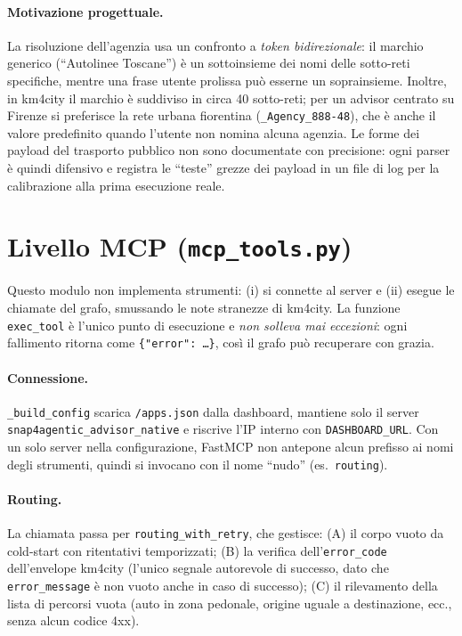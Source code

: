 \documentclass[11pt,a4paper]{article}
\begin{document}
\paragraph{Motivazione progettuale.} La risoluzione dell'agenzia usa un
confronto a \emph{token bidirezionale}: il marchio generico (``Autolinee
Toscane'') è un sottoinsieme dei nomi delle sotto-reti specifiche, mentre una
frase utente prolissa può esserne un soprainsieme. Inoltre, in km4city il
marchio è suddiviso in circa 40 sotto-reti; per un advisor centrato su Firenze
si preferisce la rete urbana fiorentina (\texttt{\_Agency\_888-48}), che è anche
il valore predefinito quando l'utente non nomina alcuna agenzia. Le forme dei
payload del trasporto pubblico non sono documentate con precisione: ogni parser
è quindi difensivo e registra le ``teste'' grezze dei payload in un file di log
per la calibrazione alla prima esecuzione reale.

\section{Livello MCP (\texttt{mcp\_tools.py})}
Questo modulo non implementa strumenti: (i) si connette al server e (ii) esegue
le chiamate del grafo, smussando le note stranezze di km4city. La funzione
\texttt{exec\_tool} è l'unico punto di esecuzione e \emph{non solleva mai
eccezioni}: ogni fallimento ritorna come \texttt{\{"error": \dots\}}, così il
grafo può recuperare con grazia.

\paragraph{Connessione.} \texttt{\_build\_config} scarica \texttt{/apps.json}
dalla dashboard, mantiene solo il server \texttt{snap4agentic\_advisor\_native}
e riscrive l'IP interno con \texttt{DASHBOARD\_URL}. Con un solo server nella
configurazione, FastMCP non antepone alcun prefisso ai nomi degli strumenti,
quindi si invocano con il nome ``nudo'' (es.\ \texttt{routing}).

\paragraph{Routing.} La chiamata passa per \texttt{routing\_with\_retry}, che
gestisce: (A) il corpo vuoto da cold-start con ritentativi temporizzati; (B) la
verifica dell'\texttt{error\_code} dell'envelope km4city (l'unico segnale
autorevole di successo, dato che \texttt{error\_message} è non vuoto anche in
caso di successo); (C) il rilevamento della lista di percorsi vuota (auto in zona
pedonale, origine uguale a destinazione, ecc., senza alcun codice 4xx).
\end{document}
